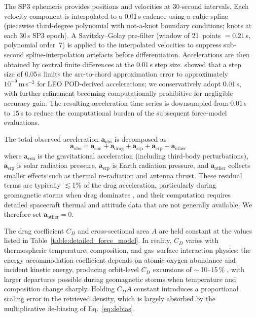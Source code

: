 \documentclass{agujournal2019}
\begin{document}
The SP3 ephemeris provides positions and velocities at 30-second intervals.
Each velocity component is interpolated to a 0.01\,s cadence using a cubic
spline (piecewise third-degree polynomial with not-a-knot boundary conditions;
knots at each 30\,s SP3 epoch). A Savitzky--Golay pre-filter (window of
21~points $= 0.21$\,s, polynomial order~7) is applied to the interpolated
velocities to suppress sub-second spline-interpolation artefacts before
differentiation. Accelerations are then obtained by central finite differences at the
0.01\,s step size.  showed that a step size
of 0.05\,s limits the arc-to-chord approximation error to approximately
$10^{-9}\,\mathrm{m\,s^{-2}}$ for LEO POD-derived accelerations; we
conservatively adopt 0.01\,s, with further refinement becoming
computationally prohibitive for negligible accuracy gain. The resulting acceleration time series is downsampled
from 0.01\,s to 15\,s to reduce the computational burden of the subsequent
force-model evaluations.

The total observed acceleration $\mathbf{a}_{\text{obs}}$ is decomposed as
\begin{equation}
\mathbf{a}_{\text{obs}}
= \mathbf{a}_{\text{con}}
+ \mathbf{a}_{\text{drag}}
+ \mathbf{a}_{\text{srp}}
+ \mathbf{a}_{\text{erp}}
+ \mathbf{a}_{\text{other}}
\end{equation}
where $\mathbf{a}_{\text{con}}$ is the gravitational acceleration (including
third-body perturbations), $\mathbf{a}_{\text{srp}}$ is solar radiation
pressure, $\mathbf{a}_{\text{erp}}$ is Earth radiation pressure, and
$\mathbf{a}_{\text{other}}$ collects smaller effects such as thermal
re-radiation and antenna thrust. These residual terms are typically
$\lesssim$1\% of the drag acceleration, particularly during geomagnetic
storms when drag dominates
\cite{Bhattarai2022High-precisionSpacecraft, March2019CHAMPModelling,
Doornbos2010NeutralSatellites}, and their computation requires detailed
spacecraft thermal and attitude data that are not generally available. We
therefore set $\mathbf{a}_{\text{other}} = 0$.

The drag coefficient $C_D$ and cross-sectional area $A$ are held constant at
the values listed in Table~\ref{table:detailed_force_model}. In reality,
$C_D$ varies with thermospheric temperature, composition, and
gas--surface interaction physics: the energy accommodation coefficient
depends on atomic-oxygen abundance and incident kinetic energy, producing
orbit-level $C_D$ excursions of $\sim$\,10--15\,\%
\cite{Pilinski2013Semi-empiricalObjects, Mehta2014ModelingSurfaces},
with larger departures possible during geomagnetic storms when
temperature and composition change sharply. Holding
$C_D A$ constant introduces a proportional scaling error in the retrieved
density, which is largely absorbed by the multiplicative de-biasing of
Eq.~\eqref{eq:debias}.
\end{document}
